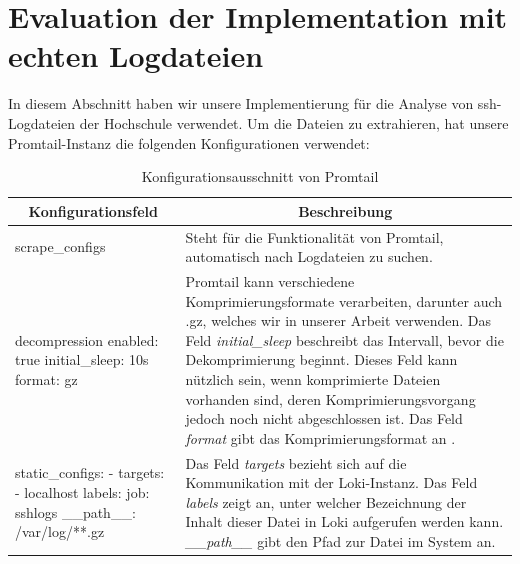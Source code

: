 \section{Evaluation der Implementation mit echten Logdateien}
In diesem Abschnitt haben wir unsere Implementierung für die Analyse von \gls{ssh}-Logdateien der Hochschule verwendet. Um die Dateien zu extrahieren, hat unsere Promtail-Instanz die folgenden Konfigurationen verwendet:


\begin{table}[H]
    \begin{tabularx}{\textwidth}{|m{5.5cm}|X|}
    \hline
    \multicolumn{1}{|c|}{\textbf{Konfigurationsfeld}} & \multicolumn{1}{|c|}{\textbf{Beschreibung}} \\
    \hline
    scrape\_configs & Steht für die Funktionalität von Promtail, automatisch nach Logdateien zu suchen. \\
    \hline
    decompression \newline
    \hphantom{12}enabled: true \newline
    \hphantom{12}initial\_sleep: 10s \newline
    \hphantom{12}format: gz & Promtail kann verschiedene Komprimierungsformate verarbeiten, darunter auch .gz, welches wir in unserer Arbeit verwenden. Das Feld \textit{initial\_sleep} beschreibt das Intervall, bevor die Dekomprimierung beginnt. Dieses Feld kann nützlich sein, wenn komprimierte Dateien vorhanden sind, deren Komprimierungsvorgang jedoch noch nicht abgeschlossen ist. Das Feld \textit{format} gibt das Komprimierungsformat an \citep{Grafana_Promtail}.  \\
    \hline
    static\_configs: \newline
    \hphantom{1}- targets: \newline
    \hphantom{123}- localhost \newline
    \hphantom{1}labels: \newline
    \hphantom{123}job: sshlogs \newline
    \hphantom{123}\_\_path\_\_: /var/log/**.gz & Das Feld \textit{targets} bezieht sich auf die Kommunikation mit der Loki-Instanz. Das Feld \textit{labels} zeigt an, unter welcher Bezeichnung der Inhalt dieser Datei in Loki aufgerufen werden kann. \textit{\_\_path\_\_} gibt den Pfad zur Datei im System an.\\
    \hline
    \end{tabularx}
    \caption[Konfigurationsausschnitt von Promtail]
    {Konfigurationsausschnitt von Promtail}
    \label{tab:KonfigPromtail}
\end{table}

